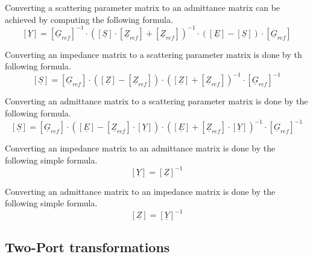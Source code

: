 Converting a scattering parameter matrix to an admittance matrix can
be achieved by computing the following formula.
\begin{equation}
\left[
\underline{Y}
\right]
=
\left[
\underline{G}_{ref}
\right]^{-1}
\cdot
\left(
\left[\underline{S}\right] \cdot \left[\underline{Z}_{ref}\right] + \left[\underline{Z}_{ref}\right]
\right)^{-1}
\cdot
\left(
\left[\underline{E}\right] - \left[\underline{S}\right]
\right)
\cdot
\left[\underline{G}_{ref}\right]
\end{equation}

Converting an impedance matrix to a scattering parameter matrix is
done by th following formula.
\begin{equation}
\left[
\underline{S}
\right]
=
\left[
\underline{G}_{ref}
\right]
\cdot
\left(
\left[\underline{Z}\right] - \left[\underline{Z}_{ref}\right]
\right)
\cdot
\left(
\left[\underline{Z}\right] + \left[\underline{Z}_{ref}\right]
\right)^{-1}
\cdot
\left[\underline{G}_{ref}\right]^{-1}
\end{equation}

Converting an admittance matrix to a scattering parameter matrix is
done by the following formula.
\begin{equation}
\left[
\underline{S}
\right]
=
\left[
\underline{G}_{ref}
\right]
\cdot
\left(
\left[\underline{E}\right] - \left[\underline{Z}_{ref}\right] \cdot \left[\underline{Y}\right]
\right)
\cdot
\left(
\left[\underline{E}\right] + \left[\underline{Z}_{ref}\right] \cdot \left[\underline{Y}\right]
\right)^{-1}
\cdot
\left[\underline{G}_{ref}\right]^{-1}
\end{equation}

Converting an impedance matrix to an admittance matrix is done by the
following simple formula.
\begin{equation}
\left[
\underline{Y}
\right]
=
\left[
\underline{Z}
\right]^{-1}
\end{equation}

Converting an admittance matrix to an impedance matrix is done by the
following simple formula.
\begin{equation}
\left[
\underline{Z}
\right]
=
\left[
\underline{Y}
\right]^{-1}
\end{equation}

\subsection{Two-Port transformations}

